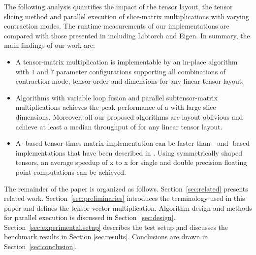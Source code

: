 The following analysis quantifies the impact of the tensor layout, the tensor slicing method and parallel execution of slice-matrix multiplications with varying contraction modes.
The runtime measurements of our implementations are compared with those presented in \cite{springer:2018:design, matthews:2018:high} including Libtorch and Eigen.
In summary, the main findings of our work are:
\begin{itemize}
	\item 
	A tensor-matrix multiplication is implementable by an in-place algorithm with $1$  and $7$  parameter configurations supporting all combinations of contraction mode, tensor order and dimensions for any linear tensor layout.
	\item 
	Algorithms with variable loop fusion and parallel subtensor-matrix multiplications achieves the peak performance of a  with large slice dimensions.
	Moreover, all our proposed algorithms are layout oblivious and achieve at least a median throughput of \tq for any linear tensor layout.
	\item
	A -based tensor-times-matrix implementation can be faster than - and -based implementations that have been described in \cite{springer:2018:design, matthews:2018:high}.
	Using symmetrically shaped tensors, an average speedup of \tq x to \tq x for single and double precision floating point computations can be achieved.
	
\end{itemize}

The remainder of the paper is organized as follows. 
Section~\ref{sec:related} presents related work.
Section~\ref{sec:preliminaries} introduces the terminology used in this paper and defines the tensor-vector multiplication.
Algorithm design and methods for parallel execution is discussed in Section~\ref{sec:design}.
Section~\ref{sec:experimental.setup} describes the test setup and discusses the benchmark results in Section \ref{sec:results}.
Conclusions are drawn in Section~\ref{sec:conclusion}.


